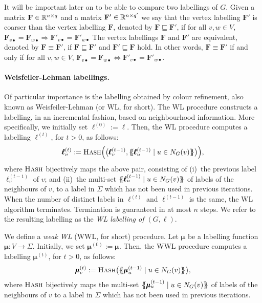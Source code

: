 It will be important later on to be able to compare two labellings of $G$.
Given a matrix $\mathbf{F} \in \mathbb{R}^{n\times q}$ and a matrix $\mathbf{F}' \in
\mathbb{R}^{n\times q'}$ we say that the vertex labelling  $\mathbf{F}'$ is coarser
than the vertex labelling $\mathbf{F}$, denoted by $\mathbf{F}\sqsubseteq
\mathbf{F}'$, if for all $v,w\in V$, $
\mathbf{F}_{v\bullet}=\mathbf{F}_{w\bullet} \Rightarrow
\mathbf{F}'_{v\bullet}=\mathbf{F}'_{w\bullet} $ The vertex labellings
$\mathbf{F}$ and $\mathbf{F}'$ are equivalent, denoted by
$\mathbf{F}\equiv\mathbf{F}'$, if $\mathbf{F}\sqsubseteq \mathbf{F}'$ and
$\mathbf{F}'\sqsubseteq \mathbf{F}$ hold. In other words,
$\mathbf{F}\equiv\mathbf{F}'$ if and only if for all $v,w\in V$, $
\mathbf{F}_{v\bullet}=\mathbf{F}_{w\bullet} \Leftrightarrow
\mathbf{F}'_{v\bullet}=\mathbf{F}'_{w\bullet} $.

\paragraph*{Weisfeiler-Lehman labellings.}
Of particular importance is the labelling obtained by colour refinement, also
known as Weisfeiler-Lehman (or WL, for short). The WL procedure constructs a
labelling, in an incremental fashion, based on neighbourhood information. More
specifically, we initially set
$\pmb{\ell}^{(0)}:=\pmb{\ell}$. Then, the WL procedure computes a labelling
$\pmb{\ell}^{(t)}$, for $t> 0$, as follows:
\[
    \pmb{\ell}^{(t)}_v:=\textsc{Hash}\Bigl(\bigl(\pmb{\ell}^{(t-1)}_v,\{\!\!\{
    \pmb{\ell}_u^{(t-1)} \mathrel{\mid} u \in N_G(v) \}\!\!\}\bigr)\Bigr),
\]
where
$\textsc{Hash}$ bijectively maps the above pair, consisting of (i)~the
previous label $\pmb{\ell}^{(t-1)}_v$ of $v$; and (ii)~the multi-set $\{\!\!\{
\pmb{\ell}_u^{(t-1)} \mathrel{\mid} u \in N_G(v) \}\!\!\}$ of labels of the neighbours of $v$, to
a label in $\Sigma$ which has not been used in previous iterations.
When the number of distinct labels in $\pmb{\ell}^{(t)}$ and
$\pmb{\ell}^{(t-1)}$ is the same, the WL algorithm terminates. Termination
is guaranteed in at most $n$ steps. We refer to the resulting labelling as the
\textit{WL labelling of $(G,\pmb{\ell})$}. 

We define a \textit{weak WL} (WWL, for short) procedure.  Let $\pmb{\mu}$ be a
labelling function $\pmb{\mu}:V\to \Sigma$.
Initially, we set $\pmb{\mu}^{(0)}:=\pmb{\mu}$.  Then, the WWL procedure
computes a labelling $\pmb{\mu}^{(t)}$, for $t> 0$, as follows:
\[
    \pmb{\mu}^{(t)}_v:=\textsc{Hash}\bigl(\{\!\!\{ \pmb{\mu}_u^{(t-1)} \mathrel{\mid} u \in
    N_G(v) \}\!\!\}\bigr),
\]
where $\textsc{Hash}$ bijectively maps the multi-set $\{\!\!\{
\pmb{\mu}_u^{(t-1)} \mathrel{\mid} u \in N_G(v) \}\!\!\}$ of labels of the neighbours of $v$
to a label in $\Sigma$ which has not been used in previous iterations. 

